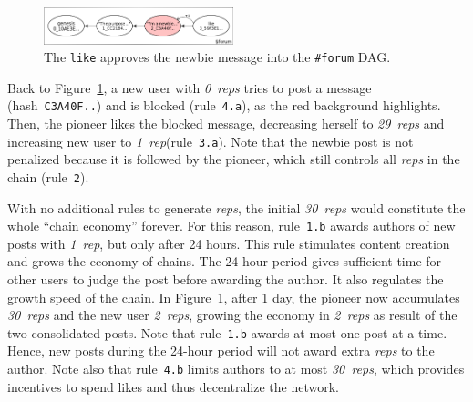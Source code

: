 \documentclass[10pt,journal,compsoc]{IEEEtran}
\newcommand{\reps}     {\emph{reps}\xspace}
\newcommand{\onerep}   {\emph{1~rep}\xspace}
\newcommand{\nreps}[1] {\emph{#1~reps\xspace}}
\begin{document}
\begin{figure}
\centering
\includegraphics[width=0.49\textwidth]{forum.png}
\caption{
    The \texttt{like} approves the newbie message into the \texttt{\#forum} DAG.
}
\label{fig.forum}
\end{figure}

Back to Figure~\ref{fig.forum}, a new user with \nreps{0} tries to post a
message (hash~\texttt{C3A40F..}) and is blocked (rule~\texttt{4.a}), as the red
background highlights.
Then, the pioneer likes the blocked message, decreasing herself to \nreps{29}
and increasing new user to \onerep (rule~\texttt{3.a}).
Note that the newbie post is not penalized because it is followed by the
pioneer, which still controls all \reps in the chain (rule~\texttt{2}).

With no additional rules to generate \reps, the initial \nreps{30} would
constitute the whole ``chain economy'' forever.
For this reason, rule~\texttt{1.b} awards authors of new posts with \onerep,
but only after 24 hours.
This rule stimulates content creation and grows the economy of chains.
The 24-hour period gives sufficient time for other users to judge the post
before awarding the author.
It also regulates the growth speed of the chain.
In Figure~\ref{fig.forum}, after 1 day, the pioneer now accumulates \nreps{30}
and the new user \nreps{2}, growing the economy in \nreps{2} as result of the
two consolidated posts.
Note that rule~\texttt{1.b} awards at most one post at a time.
Hence, new posts during the 24-hour period will not award extra \reps to the
author.
Note also that rule~\texttt{4.b} limits authors to at most \nreps{30}, which
provides incentives to spend likes and thus decentralize the network.
\end{document}
